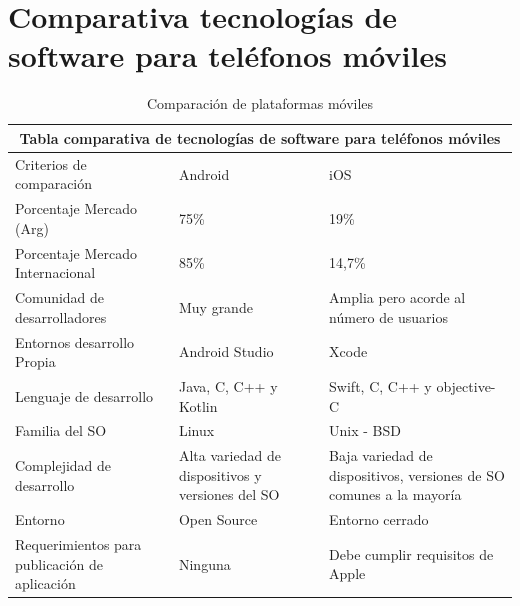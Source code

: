  \chapter{Comparativa tecnologías de software para teléfonos móviles}
 \begin{table}[h!]
            \centering
            \begin{tabularx}{\textwidth}{|X|X|X|}
                 \hline
                 \multicolumn{3}{|c|}{Tabla comparativa de tecnologías de software para teléfonos móviles}\\
                 \hline
                 Criterios de comparación & Android & iOS \\
                 \hline
                 \hline
                 
                 Porcentaje Mercado (Arg) & 75\% & 19\%  \\
                 \hline
                 
                 Porcentaje Mercado Internacional & 85\% & 14,7\% \\
                 \hline
                 
                 Comunidad de desarrolladores & Muy grande & Amplia pero acorde al número de usuarios\\
                 \hline
                 
                  Entornos desarrollo Propia & Android Studio & Xcode\\
                 \hline
                 
                 Lenguaje de desarrollo & Java, C, C++ y Kotlin & Swift, C, C++ y objective-C\\
                 \hline
                 
                 Familia del SO & Linux & Unix - BSD\\
                 \hline
                 
                 Complejidad de desarrollo & Alta variedad de dispositivos y versiones del SO & Baja variedad de dispositivos, versiones de SO comunes a la mayoría\\
                 \hline
                 
                 Entorno & Open Source & Entorno cerrado \\
                 \hline
                 
                 Requerimientos para publicación de aplicación & Ninguna & Debe cumplir requisitos de Apple\\
                 \hline
                 
            \end{tabularx}
            \caption{Comparación de plataformas móviles}
            \label{tab:ComparacionPlataformasMoviles}
        \end{table}
    \hfill \break
    \hfill \break
    \hfill \break
    \hfill \break
    \hfill \break
    \hfill \break
    \hfill \break
    \hfill \break
    \hfill \break
        

